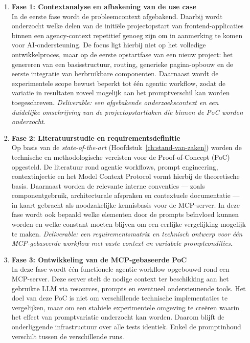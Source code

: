 \begin{enumerate}
\item \textbf{Fase 1: Contextanalyse en afbakening van de use case} \\
In de eerste fase wordt de probleemcontext afgebakend. Daarbij wordt onderzocht welke delen van de initiële projectopstart van frontend-applicaties binnen een agency-context repetitief genoeg zijn om in aanmerking te komen voor AI-ondersteuning. De focus ligt hierbij niet op het volledige ontwikkelproces, maar op de eerste opstartfase van een nieuw project: het genereren van een basisstructuur, routing, generieke pagina-opbouw en de eerste integratie van herbruikbare componenten. Daarnaast wordt de experimentele scope bewust beperkt tot één agentic workflow, zodat de variatie in resultaten zoveel mogelijk aan het promptverschil kan worden toegeschreven.
\textit{Deliverable: een afgebakende onderzoekscontext en een duidelijke omschrijving van de projectopstarttaken die binnen de PoC worden onderzocht.}

\item \textbf{Fase 2: Literatuurstudie en requirementsdefinitie} \\
Op basis van de \textit{state-of-the-art} (Hoofdstuk~\ref{ch:stand-van-zaken}) worden de technische en methodologische vereisten voor de Proof-of-Concept (PoC) opgesteld. De literatuur rond agentic workflows, prompt engineering, contextinjectie en het Model Context Protocol vormt hierbij de theoretische basis. Daarnaast worden de relevante interne conventies --- zoals componentgebruik, architecturale afspraken en contextuele documentatie --- in kaart gebracht als noodzakelijke kennisbasis voor de MCP-server. In deze fase wordt ook bepaald welke elementen door de prompts beïnvloed kunnen worden en welke constant moeten blijven om een eerlijke vergelijking mogelijk te maken.
\textit{Deliverable: een requirementsmatrix en technisch ontwerp voor één MCP-gebaseerde workflow met vaste context en variabele promptcondities.}

\item \textbf{Fase 3: Ontwikkeling van de MCP-gebaseerde PoC} \\
In deze fase wordt één functionele agentic workflow opgebouwd rond een MCP-server. Deze server stelt de nodige context ter beschikking aan het gebruikte LLM via resources, prompts en eventueel ondersteunende tools. Het doel van deze PoC is niet om verschillende technische implementaties te vergelijken, maar om een stabiele experimentele omgeving te creëren waarin het effect van promptvariatie onderzocht kan worden. Daarom blijft de onderliggende infrastructuur over alle tests identiek. Enkel de promptinhoud verschilt tussen de verschillende runs.


\end{enumerate}
